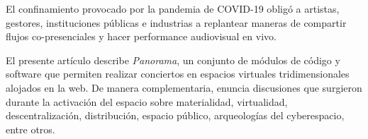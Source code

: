 
El confinamiento provocado por la pandemia de COVID-19 obligó a artistas, gestores, instituciones públicas e industrias a replantear maneras de compartir flujos co-presenciales y hacer performance audiovisual en vivo.

El presente artículo describe \textit{Panorama}, un conjunto de módulos de código y software que permiten realizar conciertos en espacios virtuales tridimensionales alojados en la web. De manera complementaria, enuncia discusiones que surgieron durante la activación del espacio sobre materialidad, virtualidad, descentralización, distribución, espacio público, arqueologías del cyberespacio, entre otros.                       

